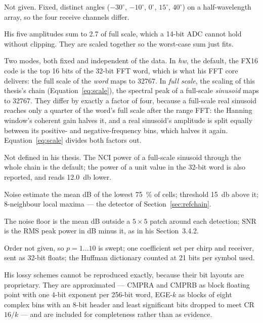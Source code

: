 \begin{description}[leftmargin=!,labelwidth=30mm,style=nextline,font=\normalfont\bfseries]
\item[Target angles] Not given. Fixed, distinct angles
($-30^\circ$, $-10^\circ$, $0^\circ$, $15^\circ$, $40^\circ$) on a
half-wavelength array, so the four receive channels differ.
\item[Amplitudes] His five amplitudes sum to 2.7 of full scale, which a 14-bit
ADC cannot hold without clipping. They are scaled together so the worst-case
sum just fits.
\item[FX16 scaling] Two modes, both fixed and independent of the data. In
\emph{hw}, the default, the FX16 code is the top 16 bits of the 32-bit FFT
word, which is what his FFT core delivers: the full scale of the \emph{word}
maps to \num{32767}. In \emph{full scale}, the scaling of this thesis's chain
(Equation~\eqref{eq:scale}), the spectral peak of a full-scale \emph{sinusoid}
maps to \num{32767}. They differ by exactly a factor of four, because a
full-scale real sinusoid reaches only a quarter of the word's full scale after
the range FFT: the Hanning window's coherent gain halves it, and a real
sinusoid's amplitude is split equally between its positive- and
negative-frequency bins, which halves it again. Equation~\eqref{eq:scale}
divides both factors out.
\item[0\,dBFS] Not defined in his thesis. The NCI power of a full-scale
sinusoid through the whole chain is the default; the power of a unit value in
the 32-bit word is also reported, and reads \SI{12.0}{\decibel} lower.
\item[Detector] Noise estimate the mean dB of the lowest \SI{75}{\percent} of
cells; threshold \SI{15}{\decibel} above it; 8-neighbour local maxima --- the
detector of Section~\ref{sec:refchain}.
\item[Noise floor and SNR] The noise floor is the mean dB outside a
$5\times5$ patch around each detection; SNR is the RMS peak power in dB minus it,
as in his Section~3.4.2.
\item[LPC-Huffman of Meucci and Mancuso] Order not given, so $p = 1 \ldots 10$
is swept; one coefficient set per chirp and receiver, sent as 32-bit floats;
the Huffman dictionary counted at 21 bits per symbol used.
\end{description}

\noindent
His lossy schemes cannot be reproduced exactly, because their bit layouts are
proprietary. They are approximated --- CMPRA and CMPRB as block floating point
with one 4-bit exponent per 256-bit word, EGE-$k$ as blocks of eight complex
bins with an 8-bit header and least significant bits dropped to meet CR
$16/k$ --- and are included for completeness rather than as evidence.

